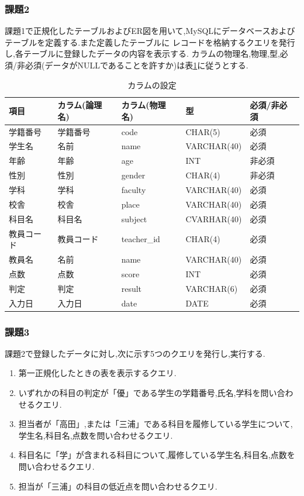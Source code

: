 \documentclass[a4j]{jarticle}
\begin{document}
    \subsubsection{課題2}
    課題1で正規化したテーブルおよびER図を用いて,MySQLにデータベースおよびテーブルを定義する.また定義したテーブルに
    レコードを格納するクエリを発行し,各テーブルに登録したデータの内容を表示する.
    カラムの物理名,物理,型,必須/非必須(データがNULLであることを許すか)は表\ref{joken}に従うとする.

    \begin{table}[H]
      \caption{カラムの設定}
      \label{joken}
      \begin{center}
        \begin{tabular}{l|l|l|l|l}\hline
          項目 & カラム(論理名) & カラム(物理名) & 型 & 必須/非必須 \\ \hline \hline
          学籍番号 & 学籍番号 & code & CHAR(5) & 必須 \\ \hline
          学生名 & 名前 & name & VARCHAR(40) & 必須 \\ \hline
          年齢 & 年齢 & age & INT & 非必須 \\ \hline
          性別 & 性別 & gender & CHAR(4) & 非必須 \\ \hline
          学科 & 学科 & faculty & VARCHAR(40) & 必須 \\ \hline
          校舎 & 校舎 & place & VARCHAR(40) & 必須 \\ \hline
          科目名 & 科目名 & subject & CVARHAR(40) & 必須 \\ \hline
          教員コード & 教員コード & teacher\_id & CHAR(4) & 必須 \\ \hline
          教員名 & 名前 & name & VARCHAR(40) & 必須 \\ \hline
          点数 & 点数 & score & INT & 必須 \\ \hline
          判定 & 判定 & result & VARCHAR(6) & 必須 \\ \hline
          入力日 & 入力日 & date & DATE & 必須 \\ \hline
        \end{tabular}
      \end{center}
      \end{table}

    \subsubsection{課題3}
    課題2で登録したデータに対し,次に示す5つのクエリを発行し,実行する.
    \begin{enumerate}
      \item 第一正規化したときの表を表示するクエリ.
      \item いずれかの科目の判定が「優」である学生の学籍番号,氏名,学科を問い合わせるクエリ.
      \item 担当者が「高田」,または「三浦」である科目を履修している学生について,学生名,科目名,点数を問い合わせるクエリ.
      \item 科目名に「学」が含まれる科目について,履修している学生名,科目名,点数を問い合わせるクエリ.
      \item 担当が「三浦」の科目の低近点を問い合わせるクエリ.
    \end{enumerate}
\end{document}
